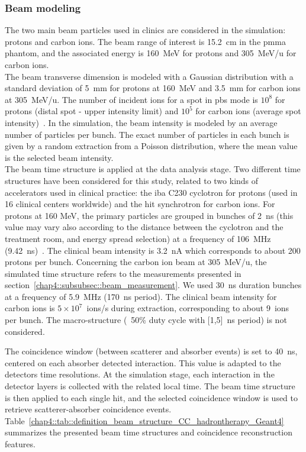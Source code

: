 \subsubsection{Beam modeling}\label{chap4::subsubsec::beam_modeling}
The two main beam particles used in clinics are considered in the simulation: protons and carbon ions. The beam range of interest is 15.2~cm in the \gls{pmma} phantom, and the associated energy is 160~MeV for protons and 305~MeV/u for carbon ions.\\ 
The beam transverse dimension is modeled with a Gaussian distribution with a standard deviation of 5~mm for protons at 160~MeV and 3.5~mm for carbon ions at 305~MeV/u. The number of incident ions for a spot in \gls{pbs} mode is $10^8$ for protons (distal spot - upper intensity limit) and $10^5$ for carbon ions (average spot intensity)~\parencite{Kramer2000, Grevillot2011, Smeets2012}. In the simulation, the beam intensity is modeled by an average number of particles per bunch. The exact number of particles in each bunch is given by a random extraction from a Poisson distribution, where the mean value is the selected beam intensity.\\
The beam time structure is applied at the data analysis stage. Two different time structures have been considered for this study, related to two kinds of accelerators used in clinical practice: the \gls{iba} C230 cyclotron for protons (used in 16 clinical centers worldwide) and the \gls{hit} synchrotron for carbon ions. For protons at 160 MeV, the primary particles are grouped in bunches of 2~ns (this value may vary also according to the distance between the cyclotron and the treatment room, and energy spread selection) at a frequency of 106~MHz (9.42~ns)~\parencite{Roellinghoff2014}. The clinical beam intensity is 3.2~nA which corresponds to about 200 protons per bunch. Concerning the carbon ion beam at 305~MeV/u, the simulated time structure refers to the measurements presented in section~\ref{chap4::subsubsec::beam_measurement}. We used 30~ns duration bunches at a frequency of 5.9~MHz (170~ns period). The clinical beam intensity for carbon ions is $5\times10^7$~ions/s during extraction, corresponding to about 9~ions per bunch. The macro-structure (~50\% duty cycle with [1,5]~ns period) is not considered. 

The coincidence window (between scatterer and absorber events) is set to 40~ns, centered on each absorber detected interaction. This value is adapted to the detectors time resolutions. At the simulation stage, each interaction in the detector layers is collected with the related local time. The beam time structure is then applied to each single hit, and the selected coincidence window is used to retrieve scatterer-absorber coincidence events.\\ 
Table~\ref{chap4::tab::definition_beam_structure_CC_hadrontherapy_Geant4} summarizes the presented beam time structures and coincidence reconstruction features.

